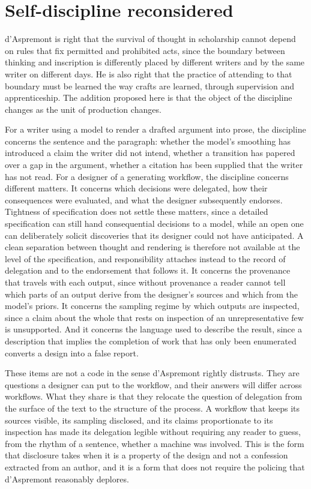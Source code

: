 \documentclass[12pt]{article}
\begin{document}
\section{Self-discipline reconsidered}

d'Aspremont is right that the survival of thought in scholarship cannot depend on rules that fix permitted and prohibited acts, since the boundary between thinking and inscription is differently placed by different writers and by the same writer on different days. He is also right that the practice of attending to that boundary must be learned the way crafts are learned, through supervision and apprenticeship. The addition proposed here is that the object of the discipline changes as the unit of production changes.

For a writer using a model to render a drafted argument into prose, the discipline concerns the sentence and the paragraph: whether the model's smoothing has introduced a claim the writer did not intend, whether a transition has papered over a gap in the argument, whether a citation has been supplied that the writer has not read. For a designer of a generating workflow, the discipline concerns different matters. It concerns which decisions were delegated, how their consequences were evaluated, and what the designer subsequently endorses. Tightness of specification does not settle these matters, since a detailed specification can still hand consequential decisions to a model, while an open one can deliberately solicit discoveries that its designer could not have anticipated. A clean separation between thought and rendering is therefore not available at the level of the specification, and responsibility attaches instead to the record of delegation and to the endorsement that follows it. It concerns the provenance that travels with each output, since without provenance a reader cannot tell which parts of an output derive from the designer's sources and which from the model's priors. It concerns the sampling regime by which outputs are inspected, since a claim about the whole that rests on inspection of an unrepresentative few is unsupported. And it concerns the language used to describe the result, since a description that implies the completion of work that has only been enumerated converts a design into a false report.

These items are not a code in the sense d'Aspremont rightly distrusts. They are questions a designer can put to the workflow, and their answers will differ across workflows. What they share is that they relocate the question of delegation from the surface of the text to the structure of the process. A workflow that keeps its sources visible, its sampling disclosed, and its claims proportionate to its inspection has made its delegation legible without requiring any reader to guess, from the rhythm of a sentence, whether a machine was involved. This is the form that disclosure takes when it is a property of the design and not a confession extracted from an author, and it is a form that does not require the policing that d'Aspremont reasonably deplores.
\end{document}
